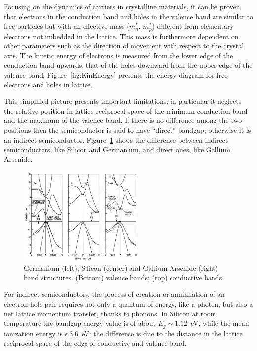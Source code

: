 Focusing on the dynamics of carriers in crystalline materials, it can be proven that  electrons in the 
conduction band and holes in the valence band are similar to free particles  but with an effective 
mass 
($m_n^*$, $m_p^*$) different from elementary electrons not imbedded in the lattice.
This mass is furthermore dependent on other parameters such as the direction of movement with 
respect to the crystal axis. The kinetic energy of electrons is measured from the lower edge of the 
conduction band upwards, that of the holes downward from the upper edge of the valence band; 
Figure~\ref{fig:KinEnergy} presents the energy diagram for free electrons and holes in lattice.

This simplified picture presents important limitations; in particular it neglects the relative position 
in lattice reciprocal space of the minimum conduction band and the maximum of the valence band. 
If there is no difference among the two positions then the semiconductor is said to have ``direct'' 
bandgap; otherwise it is an indirect semiconductor. Figure~\ref{fig:bandStructures} shows the difference 
between indirect semiconductors, like Silicon and Germanium, and direct ones, like Gallium Arsenide. 


 \begin{figure}[htbp]
   \centering
   \includegraphics[width=0.55\textwidth]{bandStructures.jpg} %
   \caption{\label{fig:bandStructures}Germanium (left), Silicon (center) and Gallium Arsenide (right) band structures. (Bottom) valence bands; (top) conductive bands.}
\end{figure}

For indirect semiconductors, the process of creation or annihilation of an electron-hole pair requires 
not only a quantum of energy, like a photon, but also a net lattice momentum transfer, thanks to 
phonons. In Silicon at room temperature the bandgap energy value is of about $E_g\sim1.12$~eV, 
while the mean ionization energy is $\epsilon~3.6$~eV: the difference is due to the distance in the 
lattice reciprocal space of the edge of conductive and valence band. 

